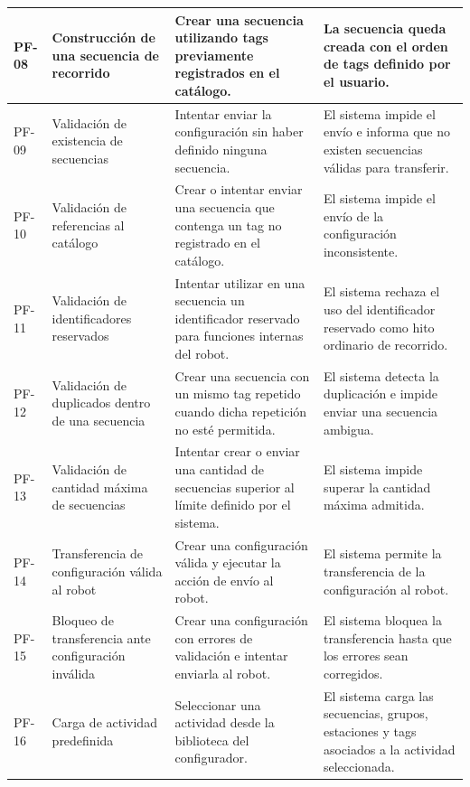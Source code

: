 \documentclass{prgrado}
\begin{document}
\begin{longtable}{L{0.10\textwidth} L{0.25\textwidth} L{0.33\textwidth} L{0.26\textwidth}}
PF-08 & Construcción de una secuencia de recorrido & Crear una secuencia utilizando tags previamente registrados en el catálogo. & La secuencia queda creada con el orden de tags definido por el usuario. \\
\midrule

PF-09 & Validación de existencia de secuencias & Intentar enviar la configuración sin haber definido ninguna secuencia. & El sistema impide el envío e informa que no existen secuencias válidas para transferir. \\
\midrule

PF-10 & Validación de referencias al catálogo & Crear o intentar enviar una secuencia que contenga un tag no registrado en el catálogo. & El sistema impide el envío de la configuración inconsistente. \\
\midrule

PF-11 & Validación de identificadores reservados & Intentar utilizar en una secuencia un identificador reservado para funciones internas del robot. & El sistema rechaza el uso del identificador reservado como hito ordinario de recorrido. \\
\midrule

PF-12 & Validación de duplicados dentro de una secuencia & Crear una secuencia con un mismo tag repetido cuando dicha repetición no esté permitida. & El sistema detecta la duplicación e impide enviar una secuencia ambigua. \\
\midrule

PF-13 & Validación de cantidad máxima de secuencias & Intentar crear o enviar una cantidad de secuencias superior al límite definido por el sistema. & El sistema impide superar la cantidad máxima admitida. \\
\midrule

PF-14 & Transferencia de configuración válida al robot & Crear una configuración válida y ejecutar la acción de envío al robot. & El sistema permite la transferencia de la configuración al robot. \\
\midrule

PF-15 & Bloqueo de transferencia ante configuración inválida & Crear una configuración con errores de validación e intentar enviarla al robot. & El sistema bloquea la transferencia hasta que los errores sean corregidos. \\
\midrule

PF-16 & Carga de actividad predefinida & Seleccionar una actividad desde la biblioteca del configurador. & El sistema carga las secuencias, grupos, estaciones y tags asociados a la actividad seleccionada. \\
\midrule


\end{longtable}
\end{document}
